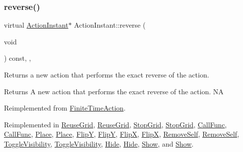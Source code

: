 \mbox{\label{classActionInstant_aeb1870802c509e1f4111c863a28e9262}} 
\subsubsection{\texorpdfstring{reverse()}{reverse()}\hspace{0.1cm}{\footnotesize\ttfamily [2/2]}}
{\footnotesize\ttfamily virtual \hyperlink{classActionInstant}{Action\+Instant}$\ast$ Action\+Instant\+::reverse (\begin{DoxyParamCaption}\item[{void}]{ }\end{DoxyParamCaption}) const\hspace{0.3cm}{\ttfamily [inline]}, {\ttfamily [override]}, {\ttfamily [virtual]}}

Returns a new action that performs the exact reverse of the action.

\begin{DoxyReturn}{Returns}
A new action that performs the exact reverse of the action.  NA 
\end{DoxyReturn}


Reimplemented from \hyperlink{classFiniteTimeAction_a886bbdd2dc82167fe6ffae664c22dacc}{Finite\+Time\+Action}.



Reimplemented in \hyperlink{classReuseGrid_aeabc5f387fb58963ae2682799742a536}{Reuse\+Grid}, \hyperlink{classReuseGrid_ac5ec66174df4786da1005acbcb9b62a8}{Reuse\+Grid}, \hyperlink{classStopGrid_a8db549ab4f3da4564fadefb33f677517}{Stop\+Grid}, \hyperlink{classStopGrid_a02dcf952035340874d9b8a207e0c4da9}{Stop\+Grid}, \hyperlink{classCallFunc_aed2cda04eeffe75361b92ef8b15127eb}{Call\+Func}, \hyperlink{classCallFunc_a5c39f0a5cc14916897280a4a37cc7125}{Call\+Func}, \hyperlink{classPlace_a73cc4e23e9c1dd0856b99871537986d0}{Place}, \hyperlink{classPlace_aea55a3981ebe1aa3ad8fd4cd7bf26337}{Place}, \hyperlink{classFlipY_a1b49c042ac0ac7036ed1447f725e091d}{FlipY}, \hyperlink{classFlipY_a41c7c49f5a9cac8f174ce8eb79eb4d0d}{FlipY}, \hyperlink{classFlipX_a73b5cd89de0852721c49506eb02046ba}{FlipX}, \hyperlink{classFlipX_af626c89fa9e3c2881fe52a48eecef17d}{FlipX}, \hyperlink{classRemoveSelf_a5bd57faed537125c8f7db63d9dad293f}{Remove\+Self}, \hyperlink{classRemoveSelf_a687363c6f0d38c4be9b797b76a505648}{Remove\+Self}, \hyperlink{classToggleVisibility_aa406922563a2c5790e580653bc16c29e}{Toggle\+Visibility}, \hyperlink{classToggleVisibility_a4904108887e11c98fd1d536bb76b2d35}{Toggle\+Visibility}, \hyperlink{classHide_aed88024d6c8fc718c8e45307a158b913}{Hide}, \hyperlink{classHide_add2d09abe89637c2e68e4196384a6dd9}{Hide}, \hyperlink{classShow_a0fdc7cbefad3afaecfc0b8fdc71e9814}{Show}, and \hyperlink{classShow_a986a611688bc5f0252bb565682f52571}{Show}.

